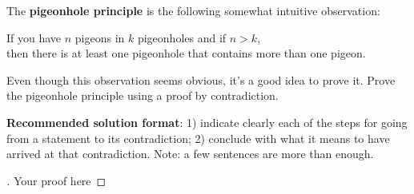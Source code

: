 \documentclass[12pt]{article}
\newenvironment{exercise}[2][Exercise]{\begin{trivlist}
\item[\hskip \labelsep {\bfseries #1}\hskip \labelsep {\bfseries #2.}]}{\end{trivlist}}
\newenvironment{solution}[1][{\color{red} Solution:}]{\begin{trivlist}
\item[\hskip \labelsep {\bfseries #1}\hskip \labelsep {\bfseries}]}{\end{trivlist}}
\begin{document}
\begin{exercise}{3}

    The \textbf{pigeonhole principle} is the following somewhat intuitive observation: 
    \begin{center}
    If you have $n$ pigeons in $k$ pigeonholes and if $n>k$,\\then there is at least one pigeonhole that contains more than one pigeon.
    \end{center}
    Even though this observation seems obvious, it's a good idea to prove it. Prove the pigeonhole principle using a proof by contradiction.

    \textbf{Recommended solution format}: 1) indicate clearly each of the steps for going from a statement to its contradiction; 2) conclude with what it means to have arrived at that contradiction. Note: a few sentences are more than enough.
        
\end{exercise}

\begin{solution} 
        \begin{proof}[\unskip\nopunct]
            Your proof here
        \end{proof}
    \end{solution}

\clearpage

\end{document}
